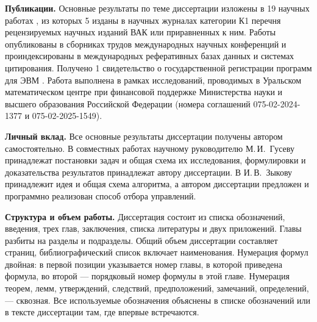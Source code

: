 \textbf{Публикации.} 
 Основные результаты по теме диссертации изложены в 19 научных работах \cite{AIP,GusevOsipovTrudy,OsipovVoronezhAbstract,OsipovAIPAbstract, SubbotinConf, Osipov, Voronezh, Minskconf, GusevOsipov, GusevOsipovPyat, GusevOsipovOCTA, GusevOsipovPyatAbstract, OsipovNLA, OsipovSopromat2022, GusevOsipovMotor, OsipovUMJ, OsipovSopromat2023, OsipovVSPU2024, OsipovSopromat2024}, из которых 5 изданы в научных журналах категории К1 \cite{GusevOsipovTrudy, Osipov, Voronezh, GusevOsipov, OsipovUMJ} перечня рецензируемых научных изданий ВАК или приравненных к ним. 
 Работы \cite{AIP, GusevOsipovMotor, GusevOsipovPyat} опубликованы в сборниках трудов международных
 научных конференций и проиндексированы в международных реферативных базах данных и системах цитирования.
Получено 1 свидетельство о государственной регистрации программ для ЭВМ \cite{Patent}.
Работа выполнена в рамках исследований, проводимых в Уральском математическом центре при финансовой поддержке Министерства науки и высшего образования Российской Федерации (номера соглашений 075-02-2024-1377 и 075-02-2025-1549).


\textbf{Личный вклад.} 
Все основные результаты диссертации получены автором самостоятельно. 
В совместных работах \cite{GusevOsipovTrudy, AIP, GusevOsipov, GusevOsipovMotor, GusevOsipovPyat, OsipovAIPAbstract, GusevOsipovPyatAbstract, SubbotinConf, Minskconf, GusevOsipovOCTA} научному руководителю М.\,И.~Гусеву принадлежат постановки задач и общая схема их исследования, формулировки и доказательства результатов принадлежат автору диссертации. 
В \cite{Patent} И.\,В.~Зыкову принадлежит идея и общая схема алгоритма, а автором диссертации предложен и программно реализован способ отбора управлений. 

\textbf{Структура и объем работы.}
Диссертация состоит из списка обозначений, введения, трех глав, заключения, списка литературы и двух приложений. 
Главы разбиты на разделы и подразделы.
Общий объем диссертации составляет \pageref{LastPage} страниц, библиографический список включает  наименования. 
Нумерация формул двойная: в первой позиции указывается номер главы, в которой приведена формула, во второй — порядковый номер формулы в этой главе. 
Нумерация теорем, лемм, утверждений, следствий, предположений, замечаний, определений, --- сквозная. 
Все используемые обозначения объяснены в списке обозначений или в тексте диссертации там, где впервые встречаются.